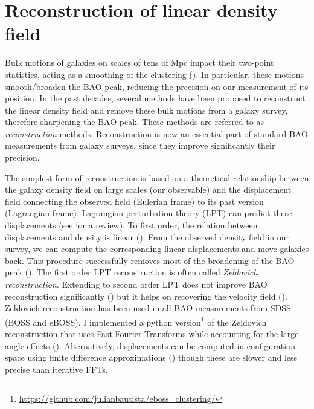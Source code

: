 \section{Reconstruction of linear density field} 
\label{galaxies:reconstruction}

Bulk motions of galaxies on scales of tens of Mpc impact their two-point statistics, 
acting as a smoothing of the clustering (\cite{eisensteinRobustnessAcousticScale2007}).  
In particular, these motions smooth/broaden the BAO peak, 
reducing the precision on our measurement of its position. 
In the past decades, several methods have been proposed to reconstruct
the linear density field and remove these bulk motions from a galaxy survey,
therefore sharpening the BAO peak.
These methods are referred to as \emph{reconstruction} methods. 
Reconstruction is now an essential part of standard BAO measurements from galaxy surveys,
since they improve significantly their precision. 

The simplest form of reconstruction is based on a theoretical relationship between 
the galaxy density field on large scales (our observable) and the displacement field connecting 
the observed field (Eulerian frame) to its past version (Lagrangian frame). 
Lagrangian perturbation theory (LPT) can predict these displacements 
(see \cite{bernardeauLargeScaleStructureUniverse2002} for a review). 
To first order, the relation between displacements and density is linear 
(\cite{zeldovichGravitationalInstabilityApproximate1970}). From the observed 
density field in our survey, we can compute the corresponding linear displacements
and move galaxies back. This procedure successfully removes most of the broadening of the BAO peak
(\cite{nusserTracingLargeScaleFluctuations1992, eisensteinImprovingCosmologicalDistance2007}).
The first order LPT reconstruction is often called \emph{Zeldovich reconstruction}. 
Extending to second order LPT does not improve BAO reconstruction significantly 
(\cite{seoHighprecisionPredictionsAcoustic2010}) but it helps on recovering the 
velocity field (\cite{kitauraEstimatingCosmicVelocity2012}).
Zeldovich reconstruction has been used in all BAO measurements from SDSS (BOSS and eBOSS).
I implemented a python version\footnote{\url{https://github.com/julianbautista/eboss_clustering/}} of 
the Zeldovich reconstruction that uses Fast Fourier Transforms while accounting for the 
large angle effects 
(\cite{burdenEfficientReconstructionLinear2014, burdenReconstructionFourierSpace2015}). 
Alternatively, displacements can be computed 
in configuration space using finite difference approximations (\cite{padmanabhanCentDistance352012})
though these are slower and less precise than iterative FFTs. 

